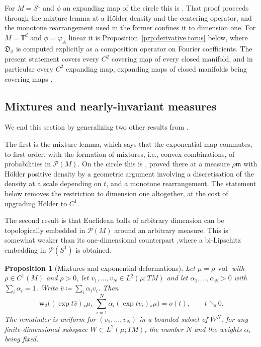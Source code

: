 \documentclass[11pt,reqno]{amsart}
\theoremstyle{plain}
\newtheorem{prp}[thm]{Proposition}
\theoremstyle{definition}
\newcommand{\dw}{\mathbf{w}_2}
\newcommand{\T}{\mathbb{T}}
\newcommand{\Leb}{\mathfrak{m}}
\newcommand{\D}{\mathfrak{D}}
\newcommand{\Prob}{\mathcal{P}}
\DeclareMathOperator{\vol}{vol}
\begin{document}
For \( M=S^1 \) and \( \phi \) an expanding map of the circle this is \cite[Theorem 5.1 and \S5.1]{kloeckner_optimal_2013_preprint}.
That proof proceeds through the mixture lemma at a Hölder density and the centering operator, and the monotone rearrangement used in the former confines it to dimension one.
For \( M=\T^d \) and \( \phi=\varphi_A \) linear it is Proposition~\ref{prp:derivative.torus} below, where \( \D_\phi \) is computed explicitly as a composition operator on Fourier coefficients.
The present statement covers every \( C^2 \) covering map of every closed manifold, and in particular every \( C^2 \) expanding map, expanding maps of closed manifolds being covering maps \cite{shub_endomorphisms_1969}.

\subsection{Mixtures and nearly-invariant measures}
We end this section by generalizing two other results from \cite{kloeckner_optimal_2013_preprint}.

The first is the mixture lemma, which says that the exponential map commutes, to first order, with the formation of mixtures, i.e., convex combinations, of probabilities in \(\Prob(M)\). 
On the circle this is \cite[Lemma 4.2]{kloeckner_optimal_2013_preprint}, proved there at a measure \( \rho\Leb \) with H\"older positive density by a geometric argument involving a discretisation of the density at a scale depending on \( t \), and a monotone rearrangement. 
The statement below removes the restriction to dimension one altogether, at the cost of upgrading H\"older to \( C^1 \).

The second result is that Euclidean balls of arbitrary dimension can be topologically embedded in \( \Prob(M) \) around an arbitrary measure. 
This is somewhat weaker than its one-dimensional counterpart \cite[Proposition 3.1]{kloeckner_optimal_2013},where a bi-Lipschitz embedding in \(\Prob(S^1)\) is obtained.


\begin{prp}[Mixtures and exponential deformations]
\label{prp:mixture}
    Let \( \mu=\rho\,\vol \) with \( \rho\in C^1(M) \) and \( \rho>0 \), let \( v_1,\dots,v_N\in L^2(\mu;TM) \) and let \( \alpha_1,\dots,\alpha_N>0 \) with
    \( \sum_i\alpha_i=1 \).  
    Write \( \bar v\coloneqq \sum_i\alpha_iv_i \).
    Then
    \[
        \dw\Big((\exp t\bar v)_\ast\mu,\ \sum_{i=1}^N\alpha_i(\exp tv_i)_\ast\mu\Big)=o(t),\qquad t\searrow0 .
    \]
    The remainder is uniform for \( (v_1,\dots,v_N) \) in a bounded subset of \( W^N \), for any finite-dimensional subspace \( W\subset L^2(\mu;TM) \), the
    number \( N \) and the weights \( \alpha_i \) being fixed.
\end{prp}
\end{document}
